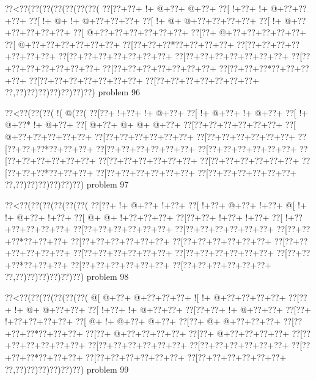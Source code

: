 \vbox{\vbox{\goo
\0??<\0??(\0??(\0??(\0??(\0??(\0??(\0??(
\0??[\0??+\0??+\- !+\- @+\0??+\- @+\0??+
\0??[\- !+\0??+\- !+\- @+\0??+\0??+\0??+
\0??[\- !+\- @+\- !+\- @+\0??+\0??+\0??+
\0??[\- !+\- @+\- @+\0??+\0??+\0??+\0??+
\0??[\- !+\- @+\0??+\0??+\0??+\0??+\0??+
\0??[\- @+\0??+\0??+\0??+\0??+\0??+\0??+
\0??[\0??+\- @+\0??+\0??+\0??+\0??+\0??+
\0??[\- @+\0??+\0??+\0??+\0??+\0??+\0??+
\0??[\0??+\0??+\0??*\0??+\0??+\0??+\0??+
\0??[\0??+\0??+\0??+\0??+\0??+\0??+\0??+
\0??[\0??+\0??+\0??+\0??+\0??+\0??+\0??+
\0??[\0??+\0??+\0??+\0??+\0??+\0??+\0??+
\0??[\0??+\0??+\0??+\0??+\0??+\0??+\0??+
\0??[\0??+\0??+\0??+\0??+\0??+\0??+\0??+
\0??[\0??+\0??+\0??*\0??+\0??+\0??+\0??+
\0??[\0??+\0??+\0??+\0??+\0??+\0??+\0??+
\0??[\0??+\0??+\0??+\0??+\0??+\0??+\0??+
\0??,\0??)\0??)\0??)\0??)\0??)\0??)\0??)
}
\hfil problem 96\hfil\break
}

\vbox{\vbox{\goo
\0??<\0??(\0??(\0??(\- !(\- @(\0??(
\0??[\0??+\- !+\0??+\- !+\- @+\0??+
\0??[\- !+\- @+\0??+\- !+\- @+\0??+
\0??[\- !+\- @+\0??*\- !+\- @+\0??+
\0??[\- @+\0??+\- @+\- @+\- @+\0??+
\0??[\0??+\0??+\0??+\0??+\0??+\0??+
\0??[\- @+\0??+\0??+\0??+\0??+\0??+
\0??[\0??+\0??+\0??+\0??+\0??+\0??+
\0??[\0??+\0??+\0??+\0??+\0??+\0??+
\0??[\0??+\0??+\0??*\0??+\0??+\0??+
\0??[\0??+\0??+\0??+\0??+\0??+\0??+
\0??[\0??+\0??+\0??+\0??+\0??+\0??+
\0??[\0??+\0??+\0??+\0??+\0??+\0??+
\0??[\0??+\0??+\0??+\0??+\0??+\0??+
\0??[\0??+\0??+\0??+\0??+\0??+\0??+
\0??[\0??+\0??+\0??*\0??+\0??+\0??+
\0??[\0??+\0??+\0??+\0??+\0??+\0??+
\0??[\0??+\0??+\0??+\0??+\0??+\0??+
\0??,\0??)\0??)\0??)\0??)\0??)\0??)
}
\hfil problem 97\hfil\break
}

\vbox{\vbox{\goo
\0??<\0??(\0??(\0??(\0??(\0??(\0??(
\0??[\0??+\- !+\- @+\0??+\- !+\0??+
\0??[\- !+\0??+\- @+\0??+\- !+\0??+
\- @[\- !+\- !+\- @+\0??+\- !+\0??+
\0??[\- @+\- @+\- !+\0??+\0??+\0??+
\0??[\0??+\0??+\- !+\0??+\- !+\0??+
\0??[\- !+\0??+\0??+\0??+\0??+\0??+
\0??[\0??+\0??+\0??+\0??+\0??+\0??+
\0??[\0??+\0??+\0??+\0??+\0??+\0??+
\0??[\0??+\0??+\0??*\0??+\0??+\0??+
\0??[\0??+\0??+\0??+\0??+\0??+\0??+
\0??[\0??+\0??+\0??+\0??+\0??+\0??+
\0??[\0??+\0??+\0??+\0??+\0??+\0??+
\0??[\0??+\0??+\0??+\0??+\0??+\0??+
\0??[\0??+\0??+\0??+\0??+\0??+\0??+
\0??[\0??+\0??+\0??*\0??+\0??+\0??+
\0??[\0??+\0??+\0??+\0??+\0??+\0??+
\0??[\0??+\0??+\0??+\0??+\0??+\0??+
\0??,\0??)\0??)\0??)\0??)\0??)\0??)
}
\hfil problem 98\hfil\break
}

\vbox{\vbox{\goo
\0??<\0??(\0??(\0??(\0??(\0??(\0??(
\- @[\- @+\0??+\- @+\0??+\0??+\0??+
\- ![\- !+\- @+\0??+\0??+\0??+\0??+
\0??[\0??+\- !+\- @+\- @+\0??+\0??+
\0??[\- !+\0??+\- !+\- @+\0??+\0??+
\0??[\0??+\0??+\- !+\- @+\0??+\0??+
\0??[\0??+\- !+\0??+\0??+\0??+\0??+
\0??[\- @+\- !+\- @+\0??+\- @+\0??+
\0??[\0??+\- @+\- @+\0??+\0??+\0??+
\0??[\0??+\0??+\0??*\0??+\0??+\0??+
\0??[\0??+\- @+\0??+\0??+\0??+\0??+
\0??[\0??+\- @+\0??+\0??+\0??+\0??+
\0??[\0??+\0??+\0??+\0??+\0??+\0??+
\0??[\0??+\0??+\0??+\0??+\0??+\0??+
\0??[\0??+\0??+\0??+\0??+\0??+\0??+
\0??[\0??+\0??+\0??*\0??+\0??+\0??+
\0??[\0??+\0??+\0??+\0??+\0??+\0??+
\0??[\0??+\0??+\0??+\0??+\0??+\0??+
\0??,\0??)\0??)\0??)\0??)\0??)\0??)
}
\hfil problem 99\hfil\break
}

